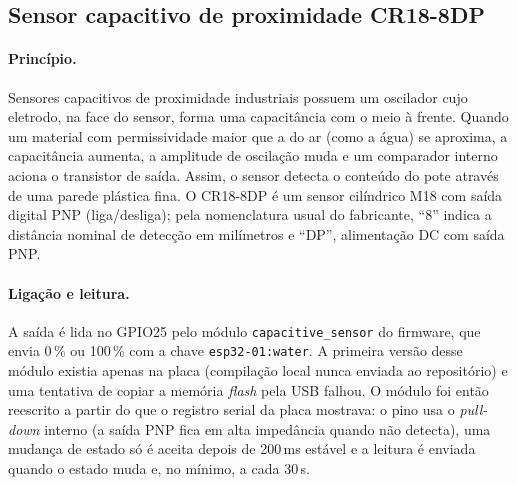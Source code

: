 \subsection{Sensor capacitivo de proximidade CR18-8DP}
\label{sec:capacitivo}

\paragraph{Princípio.}
Sensores capacitivos de proximidade industriais possuem um oscilador cujo eletrodo, na face do sensor, forma uma capacitância com o meio à frente. Quando um material com permissividade maior que a do ar (como a água) se aproxima, a capacitância aumenta, a amplitude de oscilação muda e um comparador interno aciona o transistor de saída. Assim, o sensor detecta o conteúdo do pote através de uma parede plástica fina. O CR18-8DP é um sensor cilíndrico M18 com saída digital PNP (liga/desliga); pela nomenclatura usual do fabricante, ``8'' indica a distância nominal de detecção em milímetros e ``DP'', alimentação DC com saída PNP. 

\paragraph{Ligação e leitura.}
A saída é lida no GPIO25 pelo módulo \texttt{capacitive\_sensor} do firmware, que envia 0\,\% ou 100\,\% com a chave \texttt{esp32-01:water}. A primeira versão desse módulo existia apenas na placa (compilação local nunca enviada ao repositório) e uma tentativa de copiar a memória \textit{flash} pela USB falhou. O módulo foi então reescrito a partir do que o registro serial da placa mostrava: o pino usa o \textit{pull-down} interno (a saída PNP fica em alta impedância quando não detecta), uma mudança de estado só é aceita depois de 200\,ms estável e a leitura é enviada quando o estado muda e, no mínimo, a cada 30\,s.

